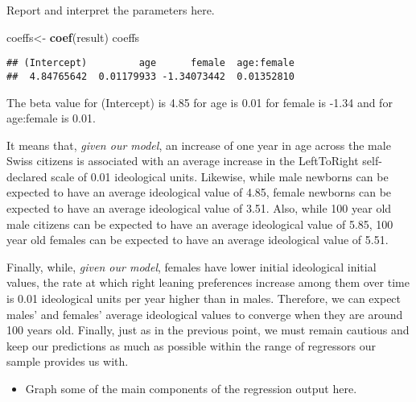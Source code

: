 \documentclass[
]{book}
\newenvironment{Shaded}{\begin{snugshade}}{\end{snugshade}}
\newcommand{\FunctionTok}[1]{\textcolor[rgb]{0.13,0.29,0.53}{\textbf{#1}}}
\newcommand{\NormalTok}[1]{#1}
\newcommand{\OtherTok}[1]{\textcolor[rgb]{0.56,0.35,0.01}{#1}}
\providecommand{\tightlist}{%
  \setlength{\itemsep}{0pt}\setlength{\parskip}{0pt}}
\begin{document}
Report and interpret the parameters here.

\begin{Shaded}
\begin{Highlighting}[]
\NormalTok{coeffs}\OtherTok{\textless{}{-}} \FunctionTok{coef}\NormalTok{(result)}
\NormalTok{coeffs}
\end{Highlighting}
\end{Shaded}

\begin{verbatim}
## (Intercept)         age      female  age:female 
##  4.84765642  0.01179933 -1.34073442  0.01352810
\end{verbatim}

The beta value for (Intercept) is 4.85 for age is 0.01 for female is -1.34 and for age:female is 0.01.

It means that, \emph{given our model}, an increase of one year in age across the male Swiss citizens is associated with an average increase in the LeftToRight self-declared scale of 0.01 ideological units. Likewise, while male newborns can be expected to have an average ideological value of 4.85, female newborns can be expected to have an average ideological value of 3.51. Also, while 100 year old male citizens can be expected to have an average ideological value of 5.85, 100 year old females can be expected to have an average ideological value of 5.51.

Finally, while, \emph{given our model}, females have lower initial ideological initial values, the rate at which right leaning preferences increase among them over time is 0.01 ideological units per year higher than in males. Therefore, we can expect males' and females' average ideological values to converge when they are around 100 years old. Finally, just as in the previous point, we must remain cautious and keep our predictions as much as possible within the range of regressors our sample provides us with.

\begin{itemize}
\tightlist
\item
  Graph some of the main components of the regression output here.
\end{itemize}
\end{document}
